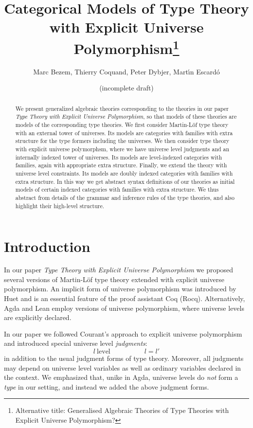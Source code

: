 \documentclass[11pt,a4paper]{article}
\theoremstyle{definition}
\begin{document}
\title{Categorical Models of Type Theory\\
with Explicit Universe Polymorphism\footnote{Alternative title: Generalised Algebraic Theories of Type Theories with Explicit Universe Polymorphism?}}

\author{Marc Bezem, Thierry Coquand, Peter Dybjer, Mart\'{\i}n Escard\'o}

\date{(incomplete draft)}
\maketitle

\begin{abstract}
We present generalized algebraic theories corresponding to the theories in our paper 
{\em Type Theory with Explicit Universe Polymorphism}, so that models of these theories are models of the corresponding type theories. We first consider Martin-Löf type theory with an external tower of universes. Its models are categories with families with extra structure for the type formers including the universes. We then consider type theory with explicit universe polymorphsm, where we have universe level judgments and an internally indexed tower of universes. Its models are level-indexed categories with families, again with appropriate extra structure. Finally, we extend the theory with universe level constraints. Its models are doubly indexed categories with families with extra structure. In this way we get abstract syntax definitions of our theories as initial models of certain indexed categories with families with extra structure. We thus abstract from details of the grammar and inference rules of the type theories, and also highlight their high-level structure.
\end{abstract}

\section{Introduction}

In our paper {\em Type Theory with Explicit Universe Polymorphism} \cite{BezemCDE22} we proposed several versions of Martin-Löf type theory extended with explicit universe polymorphism. An implicit form of universe polymorphism was introduced by Huet \cite{Huet87} and is an essential feature of the proof assistant Coq (Rocq). Alternatively, Agda \cite{agda} and Lean \cite{lean} employ versions of universe polymorphism, where universe levels are explicitly declared. 

In our paper we followed Courant's approach \cite{Courant02} to explicit universe polymorphism and introduced special universe level {\em judgments}:
$$
l\ \mathrm{level}
\hspace{5em}
l = l'
$$
in addition to the usual judgment forms of type theory. Moreover, all judgments may depend on universe level variables as well as ordinary variables declared in the context. We emphasized that, unike in Agda, universe levels do {\em not} form a {\em type} in our setting, and instead we added the above judgment forms. 
\end{document}

